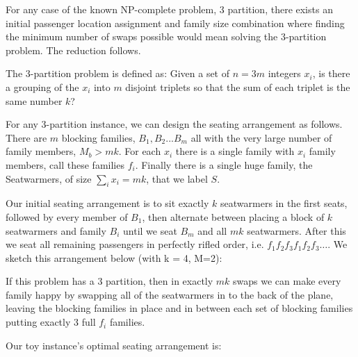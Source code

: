\documentclass[11pt,twocolumn]{article}
\begin{document}
For any case of the known NP-complete problem, 3 partition, there exists an initial passenger location assignment and family size combination where finding the minimum number of swaps possible would mean solving the 3-partition problem.  The reduction follows.

The 3-partition problem is defined as: Given a set of $n = 3m$ integers $x_i$, is there a grouping of the $x_i$ into $m$ disjoint triplets so that the sum of each triplet is the same number $k$?

For any 3-partition instance, we can design the seating arrangement as follows.  There are $m$ blocking families, $B_1, B_2... B_m$ all with the very large number of family members, $M_b > mk$.  For each $x_i$ there is a single family with $x_i$ family members, call these families $f_i$.  Finally there is a single huge family, the Seatwarmers, of size $\sum_i x_i = mk$, that we label $S$.

Our initial seating arrangement is to sit exactly $k$ seatwarmers in the first seats, followed by every member of $B_1$, then alternate between placing a block of $k$ seatwarmers and family $B_i$ until we seat $B_m$ and all $mk$ seatwarmers.  After this we seat all remaining passengers in perfectly rifled order, i.e. $f_1 f_2 f_3 f_1 f_2 f_3 \hdots$.  We sketch this arrangement below (with k = 4, M=2):

\begin{figure*}[H]
\centering
{}
\end{figure*}

If this problem has a 3 partition, then in exactly $mk$ swaps we can make every family happy by swapping all of the seatwarmers in to the back of the plane, leaving the blocking families in place and in between each set of blocking families putting exactly 3 full $f_i$ families.  

Our toy instance's optimal seating arrangement is:
\end{document}
